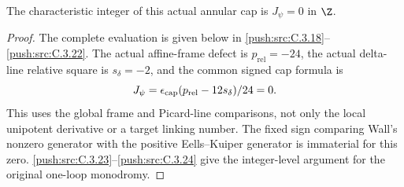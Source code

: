 \begin{corollary}\label{push:src:C.3.15}
The characteristic integer of this actual annular cap is
$J_\psi=0$ in $\Z$.
\end{corollary}

\begin{proof}
The complete evaluation is given below in \ref{push:src:C.3.18}--\ref{push:src:C.3.22}.
The actual affine-frame defect is $p_{\mathrm{rel}}=-24$,
the actual delta-line relative square is $s_\delta=-2$, and
the common signed cap formula is
\[
 J_\psi=\epsilon_{\rm cap}
              (p_{\mathrm{rel}}-12s_\delta)/24=0.
\]
This uses the global frame and Picard-line comparisons, not
only the local unipotent derivative or a target linking number.
The fixed sign comparing Wall's nonzero generator with the
positive Eells--Kuiper generator is immaterial for this zero.
\ref{push:src:C.3.23}--\ref{push:src:C.3.24} give the integer-level argument for the original
one-loop monodromy.
\end{proof}

